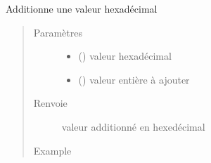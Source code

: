 \documentclass[letterpaper,10pt,french]{sphinxmanual}
\begin{document}
\begin{fulllineitems}
\label{\detokenize{modules/tools:toolbox.tools.addhex}}
Additionne une valeur hexadécimal
\begin{quote}\begin{description}
\item[{Paramètres}] \leavevmode\begin{itemize}
\item {} 
 () \textendash{} valeur hexadécimal

\item {} 
 () \textendash{} valeur entière à ajouter

\end{itemize}

\item[{Renvoie}] \leavevmode
valeur additionné en hexedécimal

\item[{Example}] \leavevmode
\begin{sphinxVerbatim}[commandchars=\\\{\}]
  
 
\end{sphinxVerbatim}

\end{description}\end{quote}

\end{fulllineitems}

\end{document}
